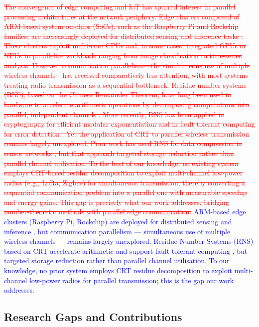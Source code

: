\documentclass[pdflatex,sn-mathphys-num]{sn-jnl}
\theoremstyle{thmstyleone}
\theoremstyle{thmstyletwo}
\theoremstyle{thmstylethree}
\begin{document}
{\textcolor{red}{\sout{The convergence of edge computing and IoT has spurred interest in parallel processing architectures at the network periphery. Edge clusters composed of ARM-based system-on-chips (SoCs), such as the Raspberry Pi and Rockchip families, are increasingly deployed for distributed sensing and inference tasks . These clusters exploit multi-core CPUs and, in some cases, integrated GPUs or NPUs to parallelize workloads ranging from image classification to time-series analysis. However, communication parallelism—the simultaneous use of multiple wireless channels—has received comparatively less attention, with most systems treating radio transmission as a sequential bottleneck.}}
\textcolor{red}{\sout{Residue number systems (RNS), based on the Chinese Remainder Theorem, have long been used in hardware to accelerate arithmetic operations by decomposing computations into parallel, independent channels . More recently, RNS has been applied in cryptography for efficient modular exponentiation and in fault-tolerant computing for error detection . Yet the application of CRT to parallel wireless transmission remains largely unexplored. Prior work has used RNS for data compression in sensor networks , but that approach targeted storage reduction rather than parallel channel utilisation. To the best of our knowledge, no existing system employs CRT-based residue decomposition to exploit multi-channel low-power radios (e.g., LoRa, Zigbee) for simultaneous transmission, thereby converting a sequential communication problem into a parallel one with measurable speedup and energy gains. This gap is precisely what our work addresses, bridging number-theoretic methods with parallel edge communication.}}
\textcolor{blue}{ARM-based edge clusters (Raspberry Pi, Rockchip) are deployed for distributed sensing and inference \cite{sharma2020edge, wang2021edge}, but communication parallelism — simultaneous use of multiple wireless channels — remains largely unexplored. Residue Number Systems (RNS) based on CRT \cite{parhami2010computer} accelerate arithmetic and support fault-tolerant computing \cite{ding1996remainder, shoup2009computational}, but \cite{wang2018novel} targeted storage reduction rather than parallel channel utilisation. To our knowledge, no prior system employs CRT residue decomposition to exploit multi-channel low-power radios for parallel transmission; this is the gap our work addresses.}

\subsection{Research Gaps and Contributions}
\label{subsec:research_gaps}

}
\end{document}
